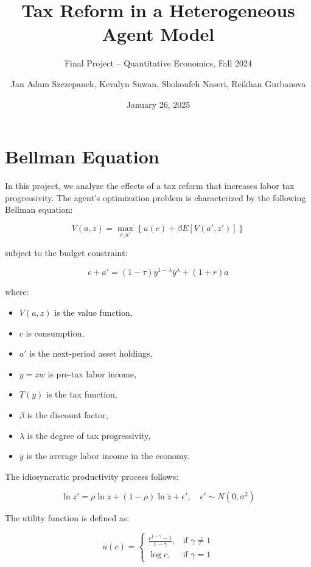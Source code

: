 \documentclass{article}
\title{Tax Reform in a Heterogeneous Agent Model}
\author{Final Project -- Quantitative Economics, Fall 2024}
\author{Jan Adam Szczepanek, Kevalyn Suwan, Shokoufeh Naseri, Reikhan Gurbanova}
\date{January 26, 2025}
\begin{document}
\maketitle

\section{Bellman Equation}

In this project, we analyze the effects of a tax reform that increases labor tax progressivity. The agent’s optimization problem is characterized by the following Bellman equation:

\begin{equation}
V(a, z) = \max_{c, a'} \left\{ u(c) + \beta E[V(a', z')] \right\}
\end{equation}

subject to the budget constraint:

\begin{equation}
c + a' = (1 - \tau) y^{1-\lambda} \bar{y}^{\lambda} + (1 + r)a
\end{equation}

where:
\begin{itemize}
\item $V(a, z)$ is the value function,
\item  $c$ is consumption,
\item  $a'$ is the next-period asset holdings,
\item  $y = zw$ is pre-tax labor income,
\item  $T(y)$ is the tax function,
\item  $\beta$ is the discount factor,
\item  $\lambda$ is the degree of tax progressivity,
\item  $\bar{y}$ is the average labor income in the economy.
\end{itemize}
The idiosyncratic productivity process follows:

\begin{equation}
\ln z' = \rho \ln z + (1 - \rho) \ln \tilde{z} + \epsilon', \quad \epsilon' \sim N(0, \sigma^2)
\end{equation}

The utility function is defined as:

\begin{equation}
 u(c) = \begin{cases} 
\frac{c^{1-\gamma} - 1}{1 - \gamma}, & \text{if } \gamma \neq 1 \\
\log c, & \text{if } \gamma = 1
\end{cases}
\end{equation}
\end{document}
